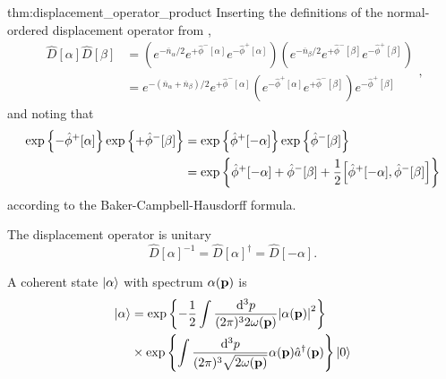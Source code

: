 \begin{delayedproof}{thm:displacement_operator_product}
	Inserting the definitions of the normal-ordered displacement operator from ,
	\begin{equation*}
		\begin{split}
			\hat{D}[\alpha]
			\hat{D}[\beta]
			&=
			\left(
				e^{-\overline{n}_\alpha/2}
				e^{+\hat\phi^-[\alpha]}
				e^{-\hat\phi^+[\alpha]}
			\right)
			\left(
				e^{-\overline{n}_\beta/2}
				e^{+\hat\phi^-[\beta]}
				e^{-\hat\phi^+[\beta]}
			\right)
			\\
			&=
			e^{-(\overline{n}_\alpha+\overline{n}_\beta)/2}
			e^{+\hat\phi^-[\alpha]}
			\left(
				e^{-\hat\phi^+[\alpha]}
				e^{+\hat\phi^-[\beta]}
			\right)			
			e^{-\hat\phi^+[\beta]}
		\end{split}
		,
	\end{equation*}
	and noting that
	\begin{equation*}
		\begin{split}
			\exp\left\{
				-\hat\phi^+[\alpha]
			\right\}
			\exp\left\{
				+\hat\phi^-[\beta]
			\right\}
			&=
			\exp\left\{
				\hat\phi^+[-\alpha]
			\right\}
			\exp\left\{
				\hat\phi^-[\beta]
			\right\}
			\\
			&=
			\exp\left\{
				\hat\phi^+[-\alpha]
				+
				\hat\phi^-[\beta]
				+
				\frac{1}{2}
				\comm{\hat\phi^+[-\alpha]}{\hat\phi^-[\beta]}
			\right\}
		\end{split}
	\end{equation*}
	according to the Baker-Campbell-Hausdorff formula.
\end{delayedproof}
\begin{lemma}\label{thm:displacement_operator_unitary}
	The displacement operator is unitary
	\begin{equation}
		\hat{D}[\alpha]^{-1}
		=
		\hat{D}[\alpha]^\dagger
		=
		\hat{D}[-\alpha]
		.
	\end{equation}
\end{lemma}
\begin{definition}
	A coherent state $\ket{\alpha}$ with spectrum $\alpha(\vb{p})$ is
	\begin{equation}
		\begin{split}
			\ket{\alpha}
			&=
			\exp\left\{
				-
				\frac{1}{2}
				\int\frac{\dd[3]{p}}{(2\pi)^32\omega(\vb{p})}
				\abs{\alpha(\vb{p})}^2
			\right\}
			\\
			&\times
			\exp\left\{
				\int\frac{\dd[3]{p}}{(2\pi)^3\sqrt{2\omega(\vb{p})}}
				\alpha(\vb{p})
				\hat{a}^\dagger(\vb{p})
			\right\}
			\ket{0}
		\end{split}
	\end{equation}
\end{definition}
